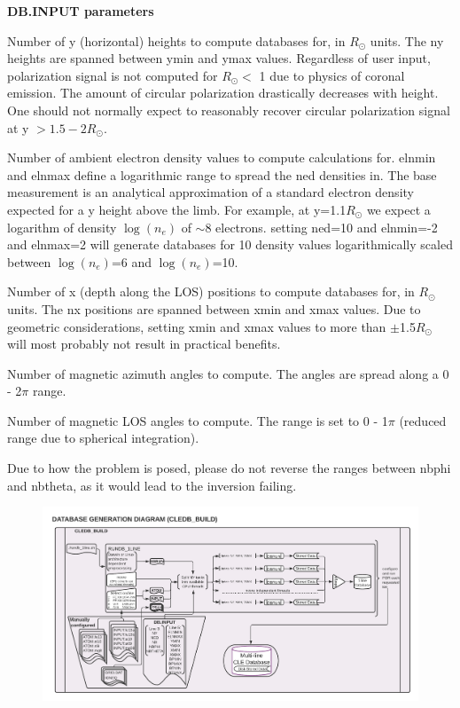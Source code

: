 \documentclass{article}
\begin{document}
\textbf{DB.INPUT parameters}
\begin{description}
    [font=\normalfont,leftmargin=1.6in,style=multiline]
	\item[ny, ymin, ymax]
	Number of y (horizontal) heights to compute databases for, in $R_\odot$ units. The ny heights are spanned between ymin and ymax values. Regardless of user input, polarization signal is not computed for $R_\odot<$ 1 due to physics of coronal emission. The amount of circular polarization drastically decreases with height. One should not normally expect to reasonably recover circular polarization signal at y $>1.5-2R_\odot$.  
	\item[ned, elnmin, elnmax]
	Number of ambient electron density values to compute calculations for. elnmin and elnmax define a logarithmic range to spread the ned densities in. The base measurement is an analytical approximation of a standard electron density expected for a y height above the limb. For example, at y=1.1$R_\odot$ we expect a logarithm of density $\log(n_e)$ of $\sim$8 electrons. setting ned=10 and elnmin=-2 and elnmax=2 will generate databases for 10 density values logarithmically scaled between $\log(n_e)$=6 and $\log(n_e)$=10.
	\item[nx, xmin, xmax]
	Number of x (depth along the LOS) positions to compute databases for, in $R_\odot$ units. The nx positions are spanned between xmin and xmax values. Due to geometric considerations, setting xmin and xmax values to more than $\pm$1.5$R_\odot$ will most probably not result in practical benefits. 
	\item[nbphi, bpmin, bpmax]
	Number of magnetic azimuth angles to compute. The angles are spread along a 0 - 2$\pi$ range.
	\item[nbtheta, btmin, btmax]	
	Number of magnetic LOS angles to compute. The range is set to 0 - 1$\pi$ (reduced range due to spherical integration).
	\item[NOTE:]
	Due to how the problem is posed, please do not reverse the ranges between nbphi and nbtheta, as it would lead to the inversion failing.	
\end{description}

\begin{figure}[!p]
\vspace{-1.9cm}\hspace{+1.5cm}\includegraphics[angle=-90,width=0.79\columnwidth]{figs/2_CLEDB_BUILD.pdf}
\end{figure} 
\end{document}
